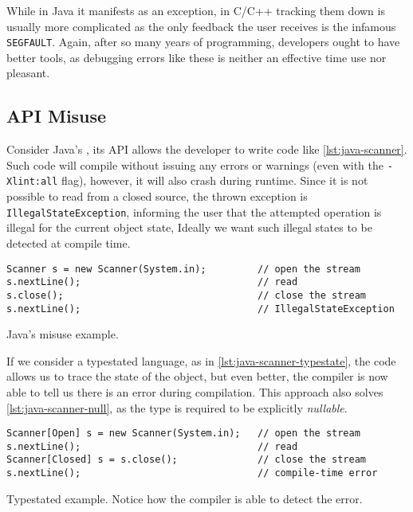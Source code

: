 While in Java it manifests as an exception,
in C/C++ tracking them down is usually more complicated as the only feedback the user receives is the infamous \texttt{SEGFAULT}.
Again, after so many years of programming, developers ought to have better tools,
as debugging errors like these is neither an effective time use nor pleasant.

\subsection{API Misuse}

Consider Java's , its API allows the developer to write code like \autoref{lst:java-scanner}.
Such code will compile without issuing any errors or warnings (even with the \texttt{-Xlint:all} flag),
however, it will also crash during runtime.
Since it is not possible to read from a closed source, the thrown exception is \texttt{IllegalStateException},
informing the user that the attempted operation is illegal for the current object state,
Ideally we want such illegal states to be detected at compile time.

\begin{listing}
    \begin{verbatim}
Scanner s = new Scanner(System.in);         // open the stream
s.nextLine();                               // read
s.close();                                  // close the stream
s.nextLine();                               // IllegalStateException
    \end{verbatim}
    \caption{Java's  misuse example.}
    \label{lst:java-scanner}
\end{listing}

If we consider a typestated language, as in \autoref{lst:java-scanner-typestate},
the code allows us to trace the state of the object, but even better,
the compiler is now able to tell us there is an error during compilation.
This approach also solves \autoref{lst:java-scanner-null}, as the type is required to be explicitly \emph{nullable}.

\begin{listing}
    \begin{verbatim}
Scanner[Open] s = new Scanner(System.in);   // open the stream
s.nextLine();                               // read
Scanner[Closed] s = s.close();              // close the stream
s.nextLine();                               // compile-time error
    \end{verbatim}
    \caption{
        Typestated  example.
        Notice how the compiler is able to detect the error.
    }
    \label{lst:java-scanner-typestate}
\end{listing}

